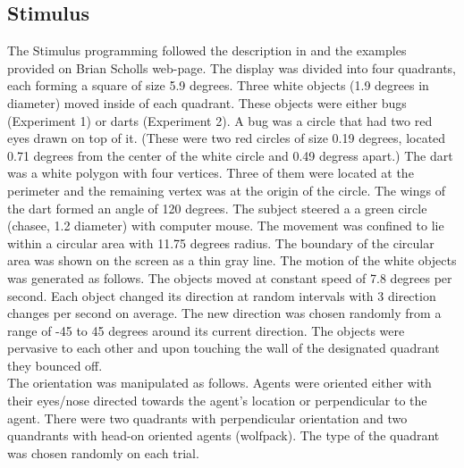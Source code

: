 \documentclass[10pt]{article}
\begin{document}
\subsection*{Stimulus}
The Stimulus programming followed the description in \cite{gao10} and the examples provided on Brian Scholls web-page. 
The display was divided into four quadrants, each forming a square of size 5.9 degrees. 
Three white objects (1.9 degrees in diameter) moved inside of each quadrant. 
These objects were either bugs (Experiment 1) or darts (Experiment 2). 
A bug was a circle that had two red eyes drawn on top of it. 
(These were two red circles of size 0.19 degrees, located 0.71 degrees from the center of the white circle and 0.49 degress apart.) 
The dart was a white polygon with four vertices. 
Three of them were located at the perimeter and the remaining vertex was at the origin of the circle. 
The wings of the dart formed an angle of 120 degrees.
The subject steered a a green circle (chasee, 1.2 diameter) with computer mouse. 
The movement was confined to lie within a circular area with 11.75 degrees radius. 
The boundary of the circular area was shown on the screen as a thin gray line. 
The motion of the white objects was generated as follows. 
The objects moved at constant speed of 7.8 degrees per second. 
Each object changed its direction at random intervals with 3 direction changes per second on average. 
The new direction was chosen randomly from a range of -45 to 45 degrees around its current direction. 
The objects were pervasive to each other and upon touching the wall of the designated quadrant they bounced off. \\
The orientation was manipulated as follows. 
Agents were oriented either with their eyes/nose directed towards the agent's location or perpendicular to the agent. 
There were two quadrants with perpendicular orientation and two quandrants with head-on oriented agents (wolfpack). 
The type of the quadrant was chosen randomly on each trial. \\
\end{document}
